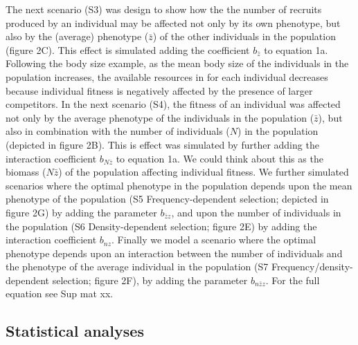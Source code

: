 \documentclass{article}
\begin{document}
The next scenario (S3) was design to show how the the number of recruits produced by an individual may be affected not only by its own phenotype, but also by the (average) phenotype ($\bar{z}$) of the other individuals in the population (figure 2C). This effect is simulated adding the coefficient $b_{\bar{z}}$ to equation 1a. Following the body size example, as the mean body size of the individuals in the population increases, the available resources in for each individual decreases because individual fitness is negatively affected by the presence of larger competitors. In the next scenario (S4), the fitness of an individual was affected not only by the average phenotype of the individuals in the population ($\bar{z}$), but also in combination with the number of individuals ($N$) in the population (depicted in figure 2B). This is effect was simulated by further adding the interaction coefficient $b_{N\bar{z}}$ to equation 1a. We could think about this as the biomass (${N\bar{z}}$) of the population affecting individual fitness. We further simulated scenarios where the optimal phenotype in the population depends upon the mean phenotype of the population (S5 Frequency-dependent selection; depicted in figure 2G) by adding the parameter $b_{\bar{z}z}$, and upon the number of individuals in the population (S6 Density-dependent selection; figure 2E) by adding the interaction coefficient $b_{nz}$. Finally we model a scenario where the optimal phenotype depends upon an interaction between the number of individuals and the phenotype of the average individual in the population (S7 Frequency/density-dependent selection; figure 2F), by adding the parameter $b_{n\bar{z}z}$. For the full equation see Sup mat xx.


 

\subsection{Statistical analyses}
\end{document}
